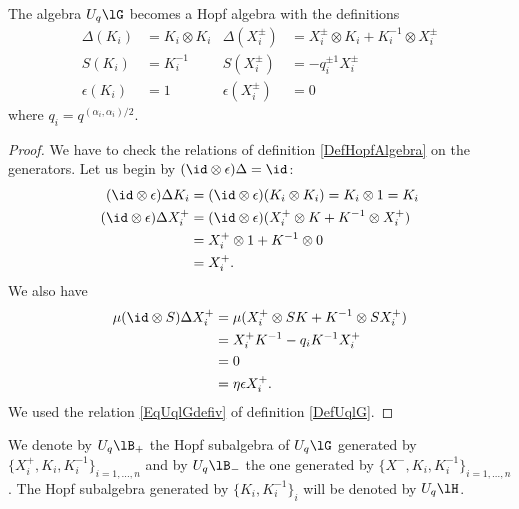 \begin{proposition}
    The algebra \( U_q\lG\) becomes a Hopf algebra with the definitions
    \begin{subequations}
        \begin{align}
            \Delta(K_i)&=K_i\otimes K_i &\Delta(X_i^{\pm})&=X_i^{\pm}\otimes K_i+K_i^{-1}\otimes X_i^{\pm}\\
            S(K_i)&=K_i^{-1}        &S(X_i^{\pm})&=-q_i^{\pm 1}X_i^{\pm}        \label{subEqantpUqGl}\\
            \epsilon(K_i)&=1        &\epsilon(X_i^{\pm})&=0
        \end{align}
    \end{subequations}
    where \( q_i=q^{(\alpha_i,\alpha_i)/2}\).
\end{proposition}

\begin{proof}
    We have to check the relations of definition \ref{DefHopfAlgebra} on the generators. Let us begin by \( (\id\otimes\epsilon)\Delta=\id \):
    \begin{subequations}
        \begin{align}
            (\id\otimes\epsilon)\Delta K_i&=(\id\otimes\epsilon )(K_i\otimes K_i)=K_i\otimes 1=K_i\\
            (\id\otimes\epsilon)\Delta X_i^+&=(\id\otimes\epsilon)(X_i^+\otimes K+K^{-1}\otimes X_i^+)\\
            &=X_i^+\otimes 1+K^{-1}\otimes 0\\
            &=X_i^+.
        \end{align}
    \end{subequations}
    We also have
    \begin{subequations}
        \begin{align}
            \mu(\id\otimes S)\Delta X_i^+&=\mu(X_i^+\otimes SK+K^{-1}\otimes SX_i^+)\\
            &=X_i^+K^{-1}-q_iK^{-1}X_i^+\\
            &=0\\
            &=\eta\epsilon X_i^+.
        \end{align}
    \end{subequations}
    We used the relation \eqref{EqUqlGdefiv} of definition \ref{DefUqlG}.
\end{proof}

We denote by \( U_q\lB_+\) the Hopf subalgebra of \( U_q\lG\) generated by \( \{ X_i^+,K_i,K_i^{-1} \}_{i=1,\ldots,n}\) and by \( U_q\lB_-\) the one generated by \( \{ X^-,K_i,K_i^{-1} \}_{i=1,\ldots,n}\). The Hopf subalgebra generated by \( \{ K_i,K_i^{-1} \}_i\) will be denoted by \( U_q\lH\).

